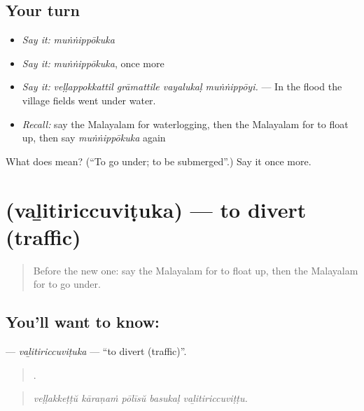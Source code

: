 \subsection*{Your turn}
\begin{itemize}
\raggedright
  \item \emph{Say it:} \emph{muṅṅippōkuka}
  \item \emph{Say it:} \emph{muṅṅippōkuka}, once more
  \item \emph{Say it:} \emph{veḷḷappokkattil grāmattile vayalukaḷ muṅṅippōyi.} — In the flood the village fields went under water.
  \item \emph{Recall:} say the Malayalam for waterlogging, then the Malayalam for to float up, then say \emph{muṅṅippōkuka} again
\end{itemize}

\begin{tcolorbox}[breakable,colback=teal!4,colframe=teal!35!black,title={Before you move on}]
What does  mean? (\textquotedblleft{}To go under; to be submerged\textquotedblright{}.) Say it once more.
\end{tcolorbox}
\section[\texorpdfstring{\ml{വഴിതിരിച്ചുവിടുക} (vaḻitiriccuviṭuka)}{വഴിതിരിച്ചുവിടുക (vaḻitiriccuviṭuka)}]{ (vaḻitiriccuviṭuka) — to divert (traffic)}

\label{lesson:ML-C512-valitiriccuvituka}



\begin{quote}
Before the new one: say the Malayalam for to float up, then the Malayalam for to go under.
\end{quote}

\subsection*{You'll want to know: }
\textbf{} — \emph{vaḻitiriccuviṭuka} — \textquotedblleft{}to divert (traffic)\textquotedblright{}.

\begin{quote}
    .
\end{quote}

\begin{quote}
\emph{veḷḷakkeṭṭŭ kāraṇaṁ pōlīsŭ basukaḷ vaḻitiriccuviṭṭu.}
\end{quote}


